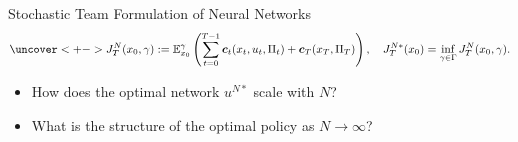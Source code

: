 \documentclass[8pt]{beamer}
\newcommand{\E}{\mathbb{E}}
\newcommand{\1}[1]{\mathbbm{1}_{\{#1\}}}
\begin{document}
\begin{frame}{Stochastic Team Formulation of Neural Networks}
    \begin{align*}
        \uncover<+->{J_T^N(x_0,\gamma):=\E^\gamma_{x_0}\left(\sum_{t=0}^{T-1}\boldsymbol{c}_t(x_t,u_t,\Pi_t)+\boldsymbol{c}_T(x_T,\Pi_T)\right),\quad J^{N\ast}_T(x_0)=\inf_{\gamma\in\Gamma}J^N_T(x_0,\gamma).}
    \end{align*}
    \begin{itemize}[<+->]
        \item How does the optimal network $u^{N\ast}$ scale with $N$?
        \item What is the structure of the optimal policy as $N\rightarrow\infty$? 
    \end{itemize}
\end{frame}

\end{document}
